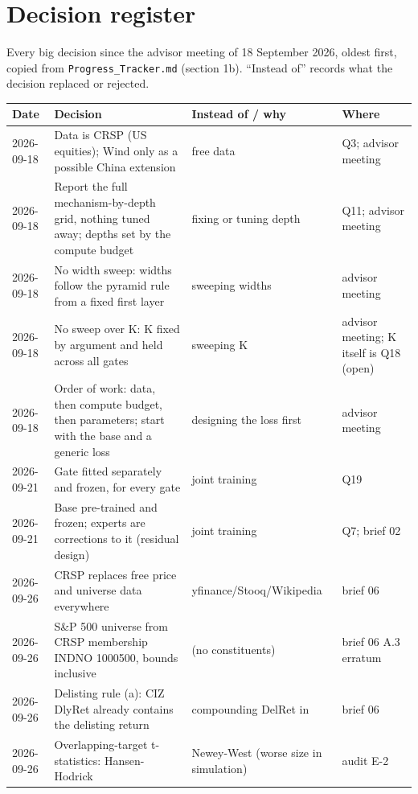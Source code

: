 \section{Decision register}
\label{sec:register}

Every big decision since the advisor meeting of 18 September 2026, oldest first, copied from
\texttt{Progress\_Tracker.md} (section 1b). ``Instead of'' records what the decision replaced or rejected.

{\footnotesize
\begin{longtable}{@{}p{1.55cm}>{\raggedright\arraybackslash}p{6.6cm}>{\raggedright\arraybackslash}p{4.2cm}>{\raggedright\arraybackslash}p{2.6cm}@{}}
\toprule
Date & Decision & Instead of / why & Where\\
\midrule
\endhead
2026-09-18 & Data is CRSP (US equities); Wind only as a possible China extension & free data & Q3; advisor meeting\\
2026-09-18 & Report the full mechanism-by-depth grid, nothing tuned away; depths set by the compute budget & fixing or tuning depth & Q11; advisor meeting\\
2026-09-18 & No width sweep: widths follow the pyramid rule from a fixed first layer & sweeping widths & advisor meeting\\
2026-09-18 & No sweep over K: K fixed by argument and held across all gates & sweeping K & advisor meeting; K itself is Q18 (open)\\
2026-09-18 & Order of work: data, then compute budget, then parameters; start with the base and a generic loss & designing the loss first & advisor meeting\\
2026-09-21 & Gate fitted separately and frozen, for every gate & joint training & Q19\\
2026-09-21 & Base pre-trained and frozen; experts are corrections to it (residual design) & joint training & Q7; brief 02\\
2026-09-26 & CRSP replaces free price and universe data everywhere & yfinance/Stooq/Wikipedia & brief 06\\
2026-09-26 & S\&P 500 universe from CRSP membership INDNO 1000500, bounds inclusive & 1000502 (no constituents) & brief 06 A.3 erratum\\
2026-09-26 & Delisting rule (a): CIZ DlyRet already contains the delisting return & compounding DelRet in & brief 06\\
2026-09-26 & Overlapping-target t-statistics: Hansen-Hodrick & Newey-West (worse size in simulation) & audit E-2\\

\end{longtable}}

